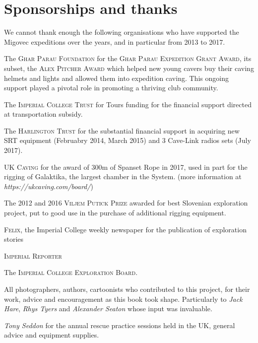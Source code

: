 \chapter{Sponsorships and thanks}
We cannot thank enough the following organisations who have supported the Migovec expeditions over the years, and in particular from 2013 to 2017.
\begin{citemize}
\item The \textsc{Ghar Parau Foundation} for  the \textsc{Ghar Parau Expedition Grant Award}, its subset, the \textsc{Alex Pitcher Award} which helped new young cavers buy their caving helmets and lights and allowed them into expedition caving. This ongoing support played a pivotal role in promoting a thriving club community.

\item The \textsc{Imperial College Trust} for Tours funding for the financial support directed at transportation subsidy.
\item The \textsc{Harlington Trust} for the substantial financial support in acquiring new SRT equipment (Februabry 2014, March 2015) and 3 Cave-Link radios sets (July 2017).
\item \textsc{UK Caving} for the award of 300m of Spanset Rope in 2017, used  in part for the rigging of Galaktika, the largest chamber in the System. (more information at \emph{https://ukcaving.com/board/})
\item The \textsc{2012} and \textsc{2016 Viljem Putick Prize} awarded for best Slovenian exploration project, put to good use in the purchase of additional rigging equipment.
\item \textsc{Felix}, the Imperial College weekly newspaper for the publication of exploration stories
\item \textsc{Imperial Reporter}
\item The \textsc{Imperial College Exploration Board}.

\mydelimiter

\item All photographers, authors, cartoonists who contributed to this project, for their work, advice and encouragement as this book took shape. Particularly to \emph{Jack Hare}, \emph{Rhys Tyers} and \emph{Alexander Seaton} whose input was invaluable. 

\item \emph{Tony Seddon} for the annual rescue practice sessions held in the UK, general advice and equipment supplies.


\end{citemize}
